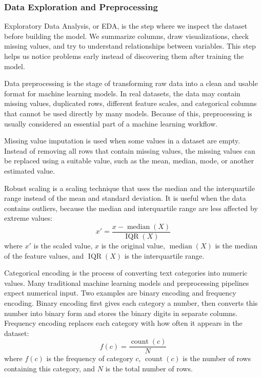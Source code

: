 \documentclass[12pt,a4paper]{report}
\begin{document}
\subsubsection{Data Exploration and Preprocessing ~\cite{komorowski2016exploratory}}
Exploratory Data Analysis, or EDA, is the step where we inspect the dataset
before building the model. We summarize columns, draw visualizations, check
missing values, and try to understand relationships between variables. This step
helps us notice problems early instead of discovering them after training the
model.

\noindent Data preprocessing is the stage of transforming raw data into a clean and usable
format for machine learning models. In real datasets, the data may contain
missing values, duplicated rows, different feature scales, and categorical
columns that cannot be used directly by many models. Because of this,
preprocessing is usually considered an essential part of a machine learning
workflow.

\noindent Missing value imputation is used when some values in a dataset are empty.
Instead of removing all rows that contain missing values, the missing values can
be replaced using a suitable value, such as the mean, median, mode, or another
estimated value.

\noindent Robust scaling is a scaling technique that uses the median and the interquartile
range instead of the mean and standard deviation. It is useful when the data
contains outliers, because the median and interquartile range are less affected
by extreme values:
\[
x' = \frac{x - \mathop{\mathrm{median}}(X)}{\mathop{\mathrm{IQR}}(X)}
\]
where $x'$ is the scaled value, $x$ is the original value,
$\mathop{\mathrm{median}}(X)$ is the median of the feature values, and
$\mathop{\mathrm{IQR}}(X)$ is the interquartile range.

\noindent Categorical encoding is the process of converting text categories into numeric
values. Many traditional machine learning models and preprocessing pipelines
expect numerical input. Two examples are binary encoding and frequency encoding.
Binary encoding first gives each category a number, then converts this number
into binary form and stores the binary digits in separate columns. Frequency
encoding replaces each category with how often it appears in the dataset:
\[
f(c) = \frac{\mathop{\mathrm{count}}(c)}{N}
\]
where $f(c)$ is the frequency of category $c$,
$\mathop{\mathrm{count}}(c)$ is the number of rows containing this category,
and $N$ is the total number of rows.
\end{document}
